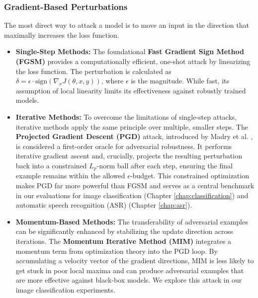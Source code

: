\documentclass[../main.tex]{subfiles}
\begin{document}
\subsubsection{Gradient-Based Perturbations}
The most direct way to attack a model is to move an input in the direction that maximally increases the loss function.
\begin{itemize}
    \item \textbf{Single-Step Methods:} The foundational \textbf{Fast Gradient Sign Method (FGSM)} \cite{goodfellow2015explaining} provides a computationally efficient, one-shot attack by linearizing the loss function. The perturbation is calculated as $\delta = \epsilon \cdot \text{sign}(\nabla_x J(\theta, x, y))$, where $\epsilon$ is the magnitude. While fast, its assumption of local linearity limits its effectiveness against robustly trained models.
    \item \textbf{Iterative Methods:} To overcome the limitations of single-step attacks, iterative methods apply the same principle over multiple, smaller steps. The \textbf{Projected Gradient Descent (PGD)} attack, introduced by Madry et al. \cite{madry2018towardspgd}, is considered a first-order oracle for adversarial robustness. It performs iterative gradient ascent and, crucially, projects the resulting perturbation back into a constrained $L_p$-norm ball after each step, ensuring the final example remains within the allowed $\epsilon$-budget. This constrained optimization makes PGD far more powerful than FGSM and serves as a central benchmark in our evaluations for image classification (Chapter \ref{chap:classification}) and automatic speech recognition (ASR) (Chapter \ref{chap:asr}).
    \item \textbf{Momentum-Based Methods:} The transferability of adversarial examples can be significantly enhanced by stabilizing the update direction across iterations. The \textbf{Momentum Iterative Method (MIM)} \cite{dong2018momentum} integrates a momentum term from optimization theory into the PGD loop. By accumulating a velocity vector of the gradient directions, MIM is less likely to get stuck in poor local maxima and can produce adversarial examples that are more effective against black-box models. We explore this attack in our image classification experiments.
\end{itemize}
\end{document}
